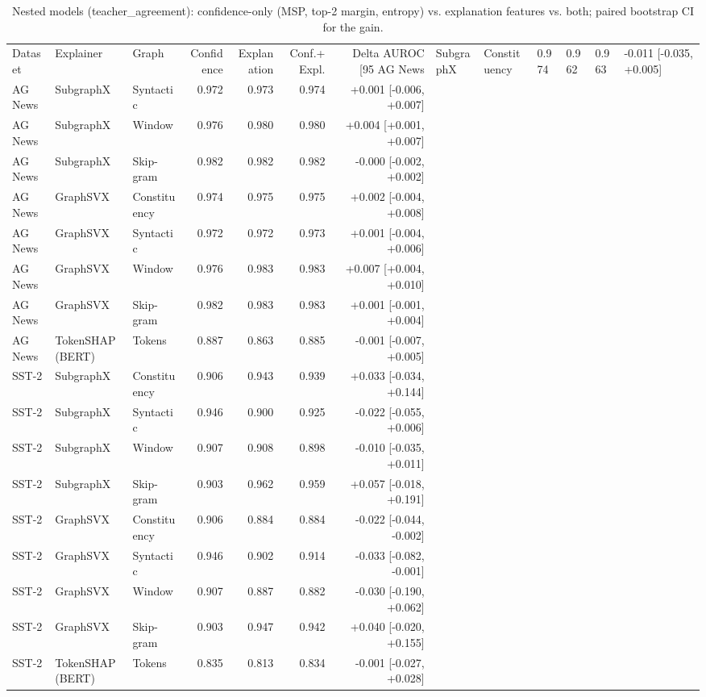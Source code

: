 \begin{table}[H]
\centering
\small
\caption{Nested models (teacher_agreement): confidence-only (MSP, top-2 margin, entropy) vs. explanation features vs. both; paired bootstrap CI for the gain.}
\label{tab:nested_teacher_agreement}
\begin{tabular}{lllrrrr}
\toprule
Dataset & Explainer & Graph & Confidence & Explanation & Conf.+Expl. & Delta AUROC [95%
\midrule
AG News & SubgraphX & Constituency & 0.974 & 0.962 & 0.963 & -0.011 [-0.035, +0.005] \\
AG News & SubgraphX & Syntactic & 0.972 & 0.973 & 0.974 & +0.001 [-0.006, +0.007] \\
AG News & SubgraphX & Window & 0.976 & 0.980 & 0.980 & +0.004 [+0.001, +0.007] \\
AG News & SubgraphX & Skip-gram & 0.982 & 0.982 & 0.982 & -0.000 [-0.002, +0.002] \\
AG News & GraphSVX & Constituency & 0.974 & 0.975 & 0.975 & +0.002 [-0.004, +0.008] \\
AG News & GraphSVX & Syntactic & 0.972 & 0.972 & 0.973 & +0.001 [-0.004, +0.006] \\
AG News & GraphSVX & Window & 0.976 & 0.983 & 0.983 & +0.007 [+0.004, +0.010] \\
AG News & GraphSVX & Skip-gram & 0.982 & 0.983 & 0.983 & +0.001 [-0.001, +0.004] \\
AG News & TokenSHAP (BERT) & Tokens & 0.887 & 0.863 & 0.885 & -0.001 [-0.007, +0.005] \\
SST-2 & SubgraphX & Constituency & 0.906 & 0.943 & 0.939 & +0.033 [-0.034, +0.144] \\
SST-2 & SubgraphX & Syntactic & 0.946 & 0.900 & 0.925 & -0.022 [-0.055, +0.006] \\
SST-2 & SubgraphX & Window & 0.907 & 0.908 & 0.898 & -0.010 [-0.035, +0.011] \\
SST-2 & SubgraphX & Skip-gram & 0.903 & 0.962 & 0.959 & +0.057 [-0.018, +0.191] \\
SST-2 & GraphSVX & Constituency & 0.906 & 0.884 & 0.884 & -0.022 [-0.044, -0.002] \\
SST-2 & GraphSVX & Syntactic & 0.946 & 0.902 & 0.914 & -0.033 [-0.082, -0.001] \\
SST-2 & GraphSVX & Window & 0.907 & 0.887 & 0.882 & -0.030 [-0.190, +0.062] \\
SST-2 & GraphSVX & Skip-gram & 0.903 & 0.947 & 0.942 & +0.040 [-0.020, +0.155] \\
SST-2 & TokenSHAP (BERT) & Tokens & 0.835 & 0.813 & 0.834 & -0.001 [-0.027, +0.028] \\
\bottomrule
\end{tabular}
\end{table}


